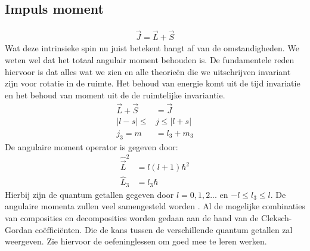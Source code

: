 \documentclass[../main.tex]{subfiles}
\begin{document}
\subsection{Impuls moment}%
\label{sub:impuls_moment}

\begin{equation}
    \begin{aligned}
        \label{eq:impuls_moment}
        \vec{J}=\vec{L}+\vec{S}
    \end{aligned}
\end{equation}
Wat deze intrinsieke spin nu juist betekent hangt af van de omstandigheden. We weten wel dat het totaal angulair moment behouden is. De fundamentele reden hiervoor is dat alles wat we zien en alle theorieën die we uitschrijven invariant zijn voor rotatie in de ruimte. Het behoud van energie komt uit de tijd invariatie en het behoud van moment uit de de ruimtelijke invariantie.\\
\begin{equation}
    \begin{aligned}
        \label{eq:samengesteld_moment}
        \vec{L} + \vec{S} &= \vec{J}\\
        |l-s| \leq &j \leq |l+s|\\
        j_3=m&=l_3+m_3
    \end{aligned}
\end{equation}
De angulaire moment operator is gegeven door:
\begin{equation}
    \begin{aligned}
        \label{eq:ang_mom_op}
        \hat{\vec{L}}^2&=l(l+1)\hbar^2\\
        \hat{L}_3&=l_3\hbar
    \end{aligned}
\end{equation}
Hierbij zijn de quantum getallen gegeven door $l=0,1,2...$ en $-l\leq l_3\leq l$. De angulaire momenta zullen veel samengesteld worden . Al de mogelijke combinaties van composities en decomposities worden gedaan aan de hand van de Cleksch-Gordan coëfficiënten. Die de kans tussen de verschillende quantum getallen zal weergeven. Zie hiervoor de oefeninglessen om goed mee te leren werken. 
\end{document}
